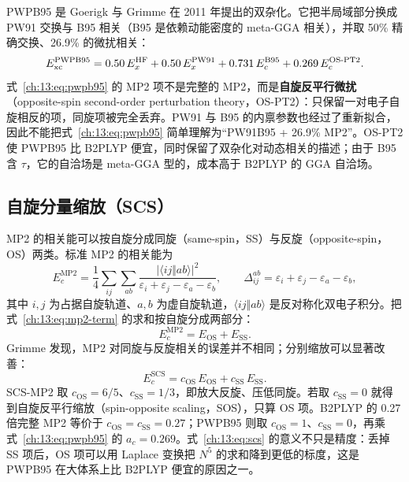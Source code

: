 PWPB95 是 Goerigk 与 Grimme 在 2011 年提出的双杂化\citep{goerigk2011pwpb95}。它把半局域部分换成 PW91 交换与 B95 相关（B95 是依赖动能密度的 meta-GGA 相关），并取 50\% 精确交换、26.9\% 的微扰相关：
\begin{equation}
E_{\mathrm{xc}}^{\mathrm{PWPB95}}
= 0.50\,E_x^{\mathrm{HF}}
+ 0.50\,E_x^{\mathrm{PW91}}
+ 0.731\,E_c^{\mathrm{B95}}
+ 0.269\,E_c^{\mathrm{OS\text{-}PT2}}.
\label{ch:13:eq:pwpb95}
\end{equation}
式~\eqref{ch:13:eq:pwpb95} 的 MP2 项不是完整的 MP2，而是\textbf{自旋反平行微扰}（opposite-spin second-order perturbation theory，OS-PT2）：只保留一对电子自旋相反的项，同旋项被完全丢弃。PW91 与 B95 的内禀参数也经过了重新拟合，因此不能把式~\eqref{ch:13:eq:pwpb95} 简单理解为“PW91B95 + 26.9\% MP2”。OS-PT2 使 PWPB95 比 B2PLYP 便宜，同时保留了双杂化对动态相关的描述；由于 B95 含 $\tau$，它的自洽场是 meta-GGA 型的，成本高于 B2PLYP 的 GGA 自洽场。

\subsection{自旋分量缩放（SCS）}
\label{ch:13:sec:scs}

MP2 的相关能可以按自旋分成同旋（same-spin，SS）与反旋（opposite-spin，OS）两类。标准 MP2 的相关能为
\begin{equation}
E_c^{\mathrm{MP2}}
= \frac{1}{4}\sum_{ij}\sum_{ab}
\frac{\lvert\langle ij\Vert ab\rangle\rvert^2}
{\varepsilon_i+\varepsilon_j-\varepsilon_a-\varepsilon_b},
\qquad
\Delta_{ij}^{ab}
= \varepsilon_i+\varepsilon_j-\varepsilon_a-\varepsilon_b,
\label{ch:13:eq:mp2-term}
\end{equation}
其中 $i,j$ 为占据自旋轨道、$a,b$ 为虚自旋轨道，$\langle ij\Vert ab\rangle$ 是反对称化双电子积分。把式~\eqref{ch:13:eq:mp2-term} 的求和按自旋分成两部分：
\begin{equation}
E_c^{\mathrm{MP2}} = E_{\mathrm{OS}} + E_{\mathrm{SS}}.
\label{ch:13:eq:mp2-split}
\end{equation}
Grimme 发现，MP2 对同旋与反旋相关的误差并不相同；分别缩放可以显著改善\citep{grimme2003scsmp2}：
\begin{equation}
E_c^{\mathrm{SCS}}
= c_{\mathrm{OS}}\,E_{\mathrm{OS}}
+ c_{\mathrm{SS}}\,E_{\mathrm{SS}}.
\label{ch:13:eq:scs}
\end{equation}
SCS-MP2 取 $c_{\mathrm{OS}}=6/5$、$c_{\mathrm{SS}}=1/3$，即放大反旋、压低同旋。若取 $c_{\mathrm{SS}}=0$ 就得到自旋反平行缩放（spin-opposite scaling，SOS），只算 OS 项。B2PLYP 的 0.27 倍完整 MP2 等价于 $c_{\mathrm{OS}}=c_{\mathrm{SS}}=0.27$；PWPB95 则取 $c_{\mathrm{OS}}=1$、$c_{\mathrm{SS}}=0$，再乘式~\eqref{ch:13:eq:pwpb95} 的 $a_c=0.269$。式~\eqref{ch:13:eq:scs} 的意义不只是精度：丢掉 SS 项后，OS 项可以用 Laplace 变换把 $N^5$ 的求和降到更低的标度，这是 PWPB95 在大体系上比 B2PLYP 便宜的原因之一。

